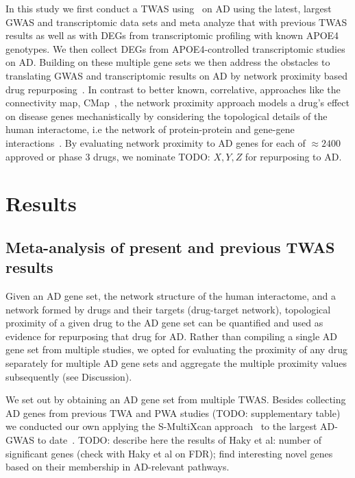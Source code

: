 \documentclass[letterpaper]{article}
\begin{document}
In this study we first conduct a TWAS using~\citep{Barbeira2018} on AD using the
latest, largest GWAS and transcriptomic data sets and meta analyze that with
previous TWAS results as well as with DEGs from transcriptomic profiling with
known APOE4 genotypes.  We then collect DEGs from APOE4-controlled
transcriptomic studies on AD.  Building on these multiple gene sets we then
address the obstacles to translating GWAS and transcriptomic results on AD by
network proximity based drug repurposing~\citep{Cheng2018}.  In contrast to
better known, correlative, approaches like the connectivity map,
CMap~\citep{Lamb2006}, the network proximity approach models a drug's effect
on disease genes mechanistically by considering the topological details of the
human interactome, i.e the network of protein-protein and gene-gene
interactions~\citep{Guney2016,Barabasi2011}.  By evaluating network proximity
to AD genes for each of $\approx 2400$ approved or phase 3 drugs, we nominate
TODO: $X, Y, Z$ for repurposing to AD.

\section{Results}

\subsection{Meta-analysis of present and previous TWAS results}

Given an AD gene set, the network structure of the human interactome, and a
network formed by drugs and their targets (drug-target network), topological
proximity of a given drug to the AD gene set can be
quantified\citep{Guney2016} and used as evidence for repurposing that drug for
AD.  Rather than compiling a single AD gene set from multiple studies, we
opted for evaluating the proximity of any drug separately for multiple AD gene
sets and aggregate the multiple proximity values subsequently (see Discussion).

We set out by obtaining an AD gene set from multiple TWAS.  Besides collecting
AD genes from previous TWA and PWA studies (TODO: supplementary table) we
conducted our own applying the S-MultiXcan approach~\citep{Barbeira2018} to
the largest AD-GWAS to date~\citep{Schwartzentruber2021}.  TODO: describe
here the results of Haky et al: number of significant genes (check with Haky
et al on FDR); find interesting novel genes based on their membership in
AD-relevant pathways.
\end{document}
